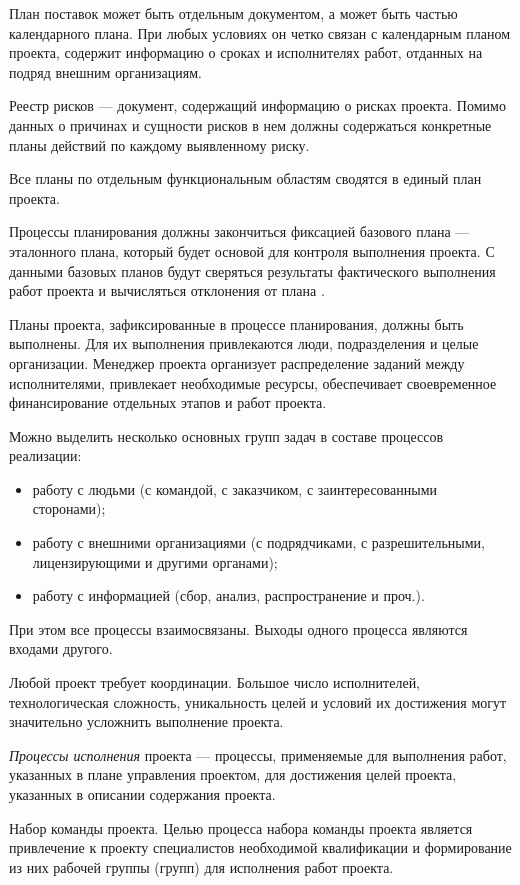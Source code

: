 План поставок может быть отдельным документом, а может быть частью календарного плана.
При любых условиях он четко связан с календарным планом проекта, содержит информацию о сроках и ис­полнителях работ, отданных на подряд внешним организациям.

Реестр рисков --- документ, содержащий информацию о рисках проекта.
Помимо данных о причинах и сущности рисков в нем долж­ны содержаться конкретные планы действий по каждому выявленно­му риску.

Все планы по отдельным функциональным областям сводятся в единый план проекта.

Процессы планирования должны закончиться фиксацией базово­го плана --- эталонного плана, который будет основой для контро­ля выполнения проекта.
С данными базовых планов будут сверяться результаты фактического выполнения работ проекта и вычисляться отклонения от плана \cite[174--175]{polkovnikov}.

Планы проекта, зафиксированные в процессе планирования, должны быть выполнены.
Для их выполнения привлекаются люди, подразде­ления и целые организации.
Менеджер проекта организует распре­деление заданий между исполнителями, привлекает необходимые ре­сурсы, обеспечивает своевременное финансирование отдельных этапов и работ проекта.

Можно выделить несколько основных групп задач в составе про­цессов реализации:
\begin{itemize}
	\item работу с людьми (с командой, с заказчиком, с заинтересованными сторонами);
	\item работу с внешними организациями (с подрядчиками, с разреши­тельными, лицензирующими и другими органами);
	\item работу с информацией (сбор, анализ, распространение и проч.).
\end{itemize}

При этом все процессы взаимосвязаны.
Выходы одного процесса являются входами другого.

Любой проект требует координации.
Большое число исполнителей, технологическая сложность, уникальность целей и условий их дости­жения могут значительно усложнить выполнение проекта.


\textit{Процессы исполнения} проекта --- процессы, применяемые для выполнения работ, указанных в плане управления проектом, для достижения целей проекта, указанных в описании содержания проекта.

Набор команды проекта.
Целью процесса набора команды проекта является привлечение к проекту специалистов необходимой квалификации и формирование из них рабочей группы (групп) для исполнения работ проекта.

